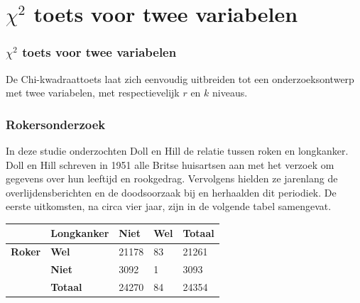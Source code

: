 \documentclass[aspectratio=169]{beamer}
\begin{document}
\section{$\chi^{2}$ toets voor twee variabelen}

\begin{frame}
  \frametitle{$\chi^{2}$ toets voor twee variabelen}
  De Chi-kwadraattoets  laat zich eenvoudig uitbreiden tot een onderzoeksontwerp met twee variabelen, met respectievelijk $r$ en $k$ niveaus.
\end{frame}

\begin{frame}
  \frametitle{Rokersonderzoek}
  In deze studie onderzochten Doll en Hill de relatie tussen roken en longkanker. Doll en Hill schreven in 1951 alle Britse huisartsen aan met het verzoek om gegevens over hun leeftijd en rookgedrag. Vervolgens hielden ze jarenlang de overlijdensberichten en de doodsoorzaak bij en herhaalden dit periodiek. De eerste uitkomsten, na circa vier jaar, zijn in de volgende tabel samengevat.

  \begin{table}[h]
    \begin{tabular}{@{}lllll@{}}
      \toprule
                     & \textbf{Longkanker} & \textbf{Niet} & \textbf{Wel} & \textbf{Totaal} \\ \midrule
      \textbf{Roker} & \textbf{Wel}        & 21178         & 83           & 21261           \\
                     & \textbf{Niet}       & 3092          & 1            & 3093            \\
                     & \textbf{Totaal}     & 24270         & 84           & 24354           \\ \bottomrule
    \end{tabular}
  \end{table}
\end{frame}
\end{document}
